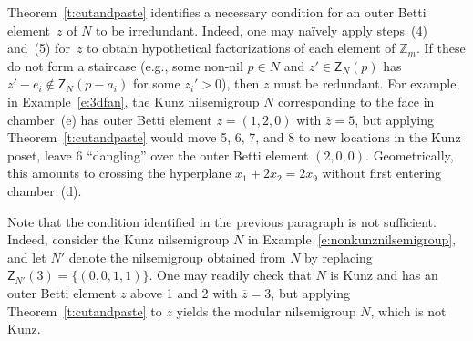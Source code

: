 \documentclass[ALCO, Unicode]{cedram}
\newcommand\ZZ{\mathbb{Z}}
\begin{document}
\begin{remas}\label{r:cutandpaste}
Theorem~\ref{t:cutandpaste} identifies a necessary condition for an outer Betti element~$z$ of $N$ to be irredundant.  Indeed, one may na\"ively apply steps~(4) and~(5) for~$z$ to obtain hypothetical factorizations of each element of $\ZZ_m$.  If these do not form a staircase (e.g., some non-nil $p \in N$ and $z' \in \mathsf Z_N(p)$ has $z' - e_i \notin \mathsf Z_N(p - a_i)$ for some $z_i' > 0$), then $z$ must be redundant.  For example, in Example~\ref{e:3dfan}, the Kunz nilsemigroup $N$ corresponding to the face in chamber~(e) has outer Betti element $z = (1,2,0)$ with $\overline z = 5$, but applying Theorem~\ref{t:cutandpaste} would move 5, 6, 7, and 8 to new locations in the Kunz poset, leave 6 ``dangling'' over the outer Betti element $(2,0,0)$.  
Geometrically, this amounts to crossing the hyperplane $x_1 + 2x_2 = 2x_9$ without first entering chamber~(d).  

Note that the condition identified in the previous paragraph is not sufficient.  Indeed, consider the Kunz nilsemigroup $N$ in Example~\ref{e:nonkunznilsemigroup}, and let $N'$ denote the nilsemigroup obtained from $N$ by replacing $\mathsf Z_{N'}(3) = \{(0,0,1,1)\}$.  One may readily check that $N$ is Kunz and has an outer Betti element $z$ above 1 and 2 with $\overline z = 3$, but applying Theorem~\ref{t:cutandpaste} to $z$ yields the modular nilsemigroup $N$, which is not Kunz.  
\end{remas}
\end{document}
